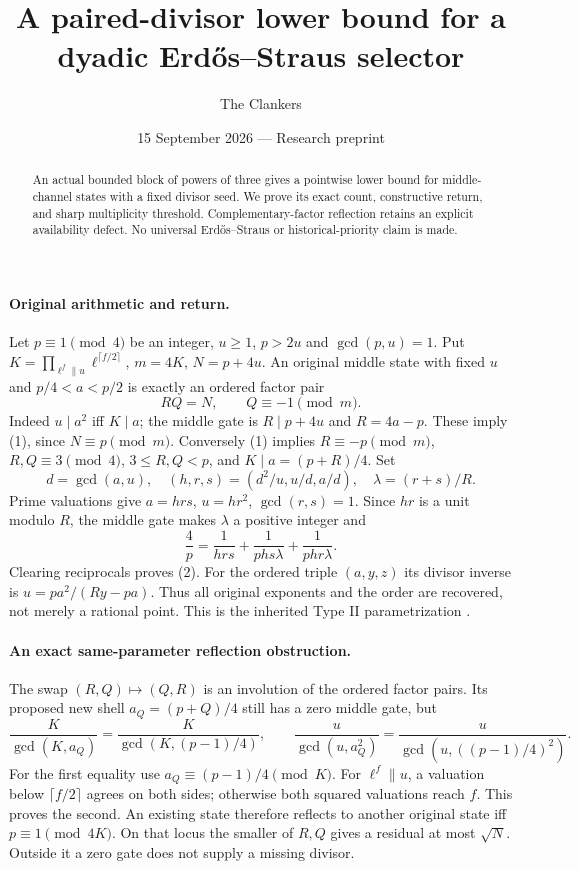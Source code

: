 \documentclass[10pt,a4paper]{article}
\title{A paired-divisor lower bound for a dyadic Erd\H{o}s--Straus selector}
\author{The Clankers}
\date{15 September 2026 --- Research preprint}
\begin{document}
\maketitle\vspace{-3mm}
\begin{abstract}
An actual bounded block of powers of three gives a pointwise lower bound for
middle-channel states with a fixed divisor seed. We prove its exact count,
constructive return, and sharp multiplicity threshold. Complementary-factor
reflection retains an explicit availability defect. No universal
Erd\H{o}s--Straus or historical-priority claim is made.
\end{abstract}

\paragraph{Original arithmetic and return.}
Let $p\equiv1\pmod4$ be an integer, $u\ge1$, $p>2u$ and $\gcd(p,u)=1$.
Put $K=\prod_{\ell^f\parallel u}\ell^{\lceil f/2\rceil}$, $m=4K$, $N=p+4u$.
An original middle state with fixed $u$ and $p/4<a<p/2$ is exactly an ordered
factor pair
\[
 \boxed{RQ=N,\qquad Q\equiv-1\pmod m.}\tag{1}
\]
Indeed $u\mid a^2$ iff $K\mid a$; the middle gate is $R\mid p+4u$ and
$R=4a-p$. These imply (1), since $N\equiv p\pmod m$.
Conversely (1) implies $R\equiv-p\pmod m$, $R,Q\equiv3\pmod4$,
$3\le R,Q<p$, and $K\mid a=(p+R)/4$. Set
\[
 d=\gcd(a,u),\quad(h,r,s)=(d^2/u,u/d,a/d),\quad\lambda=(r+s)/R.
\]
Prime valuations give $a=hrs$, $u=hr^2$, $\gcd(r,s)=1$. Since $hr$ is a unit
modulo $R$, the middle gate makes $\lambda$ a positive integer and
\[
 \boxed{\frac4p=\frac1{hrs}+\frac1{phs\lambda}+\frac1{phr\lambda}.}\tag{2}
\]
Clearing reciprocals proves (2). For the ordered triple $(a,y,z)$ its divisor
inverse is $u=pa^2/(Ry-pa)$. Thus all original exponents and the order are
recovered, not merely a rational point. This is the inherited Type II
parametrization \cite[\S2, (2.13)--(2.22), Propositions 2.6--2.7]{ET}.

\paragraph{An exact same-parameter reflection obstruction.}
The swap $(R,Q)\mapsto(Q,R)$ is an involution of the ordered factor pairs.
Its proposed new shell $a_Q=(p+Q)/4$ still has a zero middle gate, but
\[
 \boxed{
 \frac K{\gcd(K,a_Q)}=\frac K{\gcd(K,(p-1)/4)},\qquad
 \frac u{\gcd(u,a_Q^2)}=\frac u{\gcd(u,((p-1)/4)^2)}.}\tag{3}
\]
For the first equality use $a_Q\equiv(p-1)/4\pmod K$.
For $\ell^f\parallel u$, a valuation below $\lceil f/2\rceil$ agrees on both
sides; otherwise both squared valuations reach $f$. This proves the second.
An existing state therefore reflects to another original state iff
$p\equiv1\pmod{4K}$. On that locus the smaller of $R,Q$ gives a residual
at most $\sqrt N$. Outside it a zero gate does not supply a missing divisor.
\end{document}
